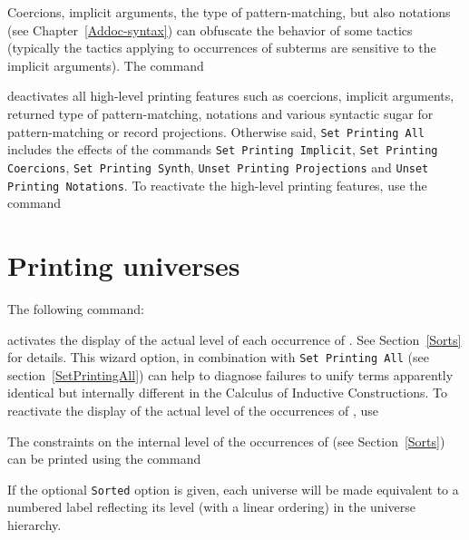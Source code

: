 Coercions, implicit arguments, the type of pattern-matching, but also
notations (see Chapter~\ref{Addoc-syntax}) can obfuscate the behavior
of some tactics (typically the tactics applying to occurrences of
subterms are sensitive to the implicit arguments). The command
\begin{quote}
{}
\end{quote}
deactivates all high-level printing features such as coercions,
implicit arguments, returned type of pattern-matching, notations and
various syntactic sugar for pattern-matching or record projections.
Otherwise said, {\tt Set Printing All} includes the effects
of the commands {\tt Set Printing Implicit}, {\tt Set Printing
Coercions}, {\tt Set Printing Synth}, {\tt Unset Printing Projections}
and {\tt Unset Printing Notations}.  To reactivate the high-level
printing features, use the command
\begin{quote}
{}
\end{quote}

\section[Printing universes]{Printing universes\label{PrintingUniverses}
}

The following command:
\begin{quote}
{}
\end{quote}
activates the display of the actual level of each occurrence of
{\Type}. See Section~\ref{Sorts} for details.  This wizard option, in
combination with \texttt{Set Printing All} (see
section~\ref{SetPrintingAll}) can help to diagnose failures to unify
terms apparently identical but internally different in the Calculus of
Inductive Constructions. To reactivate the display of the actual level
of the occurrences of {\Type}, use
\begin{quote}
{}
\end{quote}


The constraints on the internal level of the occurrences of {\Type}
(see Section~\ref{Sorts}) can be printed using the command
\begin{quote}
{}
\end{quote}
If the optional {\tt Sorted} option is given, each universe will be
made equivalent to a numbered label reflecting its level (with a
linear ordering) in the universe hierarchy.

